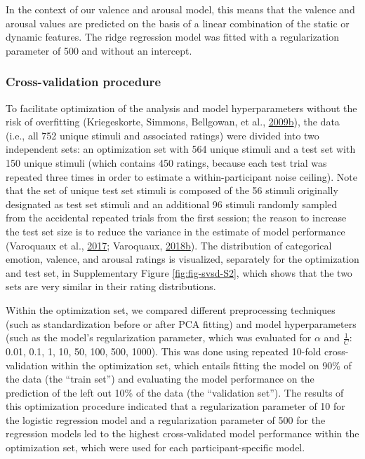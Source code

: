 \documentclass[11pt,american,a4paper,oneside,]{memoir} %
\begin{document}
In the context of our valence and arousal model, this means that the valence and arousal values are predicted on the basis of a linear combination of the static or dynamic features. The ridge regression model was fitted with a regularization parameter of 500 and without an intercept.

\hypertarget{svsd-cv}{%
\subsubsection{Cross-validation procedure}\label{svsd-cv}}

To facilitate optimization of the analysis and model hyperparameters without the risk of overfitting (Kriegeskorte, Simmons, Bellgowan, et al., \protect\hyperlink{ref-Kriegeskorte2009-yz}{2009}\protect\hyperlink{ref-Kriegeskorte2009-yz}{b}), the data (i.e., all 752 unique stimuli and associated ratings) were divided into two independent sets: an optimization set with 564 unique stimuli and a test set with 150 unique stimuli (which contains 450 ratings, because each test trial was repeated three times in order to estimate a within-participant noise ceiling). Note that the set of unique test set stimuli is composed of the 56 stimuli originally designated as test set stimuli and an additional 96 stimuli randomly sampled from the accidental repeated trials from the first session; the reason to increase the test set size is to reduce the variance in the estimate of model performance (Varoquaux et al., \protect\hyperlink{ref-Varoquaux2017-fj}{2017}; Varoquaux, \protect\hyperlink{ref-Varoquaux2018-uo}{2018}\protect\hyperlink{ref-Varoquaux2018-uo}{b}). The distribution of categorical emotion, valence, and arousal ratings is visualized, separately for the optimization and test set, in Supplementary Figure \ref{fig:fig-svsd-S2}, which shows that the two sets are very similar in their rating distributions.

Within the optimization set, we compared different preprocessing techniques (such as standardization before or after PCA fitting) and model hyperparameters (such as the model's regularization parameter, which was evaluated for \(\alpha\) and \(\frac{1}{C}\): 0.01, 0.1, 1, 10, 50, 100, 500, 1000). This was done using repeated 10-fold cross-validation within the optimization set, which entails fitting the model on 90\% of the data (the ``train set'') and evaluating the model performance on the prediction of the left out 10\% of the data (the ``validation set''). The results of this optimization procedure indicated that a regularization parameter of 10 for the logistic regression model and a regularization parameter of 500 for the regression models led to the highest cross-validated model performance within the optimization set, which were used for each participant-specific model.
\end{document}
